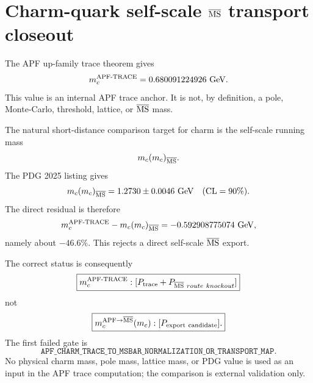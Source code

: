 \section{Charm-quark self-scale \texorpdfstring{$\overline{\rm MS}$}{MSbar} transport closeout}

The APF up-family trace theorem gives
\begin{equation}
  m_c^{\rm APF\text{-}TRACE}=0.680091224926\ {\rm GeV}.
\end{equation}
This value is an internal APF trace anchor. It is not, by definition, a pole,
Monte-Carlo, threshold, lattice, or \(\overline{\rm MS}\) mass.

The natural short-distance comparison target for charm is the self-scale
running mass
\begin{equation}
  m_c(m_c)_{\overline{\rm MS}}.
\end{equation}
The PDG 2025 listing gives
\begin{equation}
  m_c(m_c)_{\overline{\rm MS}}=1.2730\pm0.0046\ {\rm GeV}\quad({\rm CL}=90\%).
\end{equation}
The direct residual is therefore
\begin{equation}
  m_c^{\rm APF\text{-}TRACE}-m_c(m_c)_{\overline{\rm MS}}
  =-0.592908775074\ {\rm GeV},
\end{equation}
namely about \(-46.6\%\). This rejects a direct self-scale
\(\overline{\rm MS}\) export.

The correct status is consequently
\begin{equation}
\boxed{
  m_c^{\rm APF\text{-}TRACE}:
  [P_{\rm trace}+P_{\overline{\rm MS}\ route\ knockout}]
}
\end{equation}
not
\begin{equation}
\boxed{
  m_c^{\rm APF\to\overline{MS}}(m_c):[P_{\rm export\ candidate}].
}
\end{equation}
The first failed gate is
\begin{equation}
\boxed{\texttt{APF\_CHARM\_TRACE\_TO\_MSBAR\_NORMALIZATION\_OR\_TRANSPORT\_MAP}.}
\end{equation}
No physical charm mass, pole mass, lattice mass, or PDG value is used as an input
in the APF trace computation; the comparison is external validation only.
